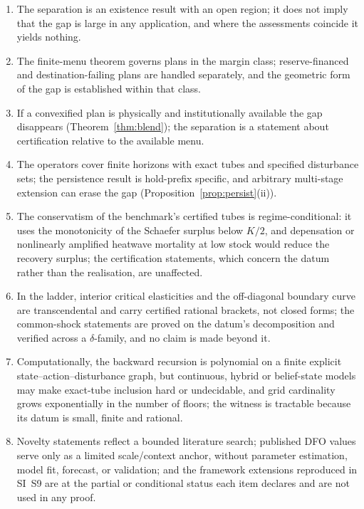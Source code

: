 \documentclass[preprint,11pt,authoryear]{elsarticle}
\theoremstyle{definition}
\theoremstyle{remark}
\begin{document}
\begin{enumerate}[label=(\roman*),leftmargin=2em]
\item The separation is an existence result with an open region; it does not imply that the gap is large in any application, and where the assessments coincide it yields nothing.
\item The finite-menu theorem governs plans in the margin class; reserve-financed and destination-failing plans are handled separately, and the geometric form of the gap is established within that class.
\item If a convexified plan is physically and institutionally available the gap disappears (Theorem~\ref{thm:blend}); the separation is a statement about certification relative to the available menu.
\item The operators cover finite horizons with exact tubes and specified disturbance sets; the persistence result is hold-prefix specific, and arbitrary multi-stage extension can erase the gap (Proposition~\ref{prop:persist}(ii)).
\item The conservatism of the benchmark's certified tubes is regime-conditional: it uses the monotonicity of the Schaefer surplus below $K/2$, and depensation or nonlinearly amplified heatwave mortality at low stock would reduce the recovery surplus; the certification statements, which concern the datum rather than the realisation, are unaffected.
\item In the ladder, interior critical elasticities and the off-diagonal boundary curve are transcendental and carry certified rational brackets, not closed forms; the common-shock statements are proved on the datum's decomposition and verified across a $\delta$-family, and no claim is made beyond it.
\item Computationally, the backward recursion is polynomial on a finite explicit state--action--disturbance graph, but continuous, hybrid or belief-state models may make exact-tube inclusion hard or undecidable, and grid cardinality grows exponentially in the number of floors; the witness is tractable because its datum is small, finite and rational.
\item Novelty statements reflect a bounded literature search; published DFO values serve only as a limited scale/context anchor, without parameter estimation, model fit, forecast, or validation; and the framework extensions reproduced in SI~S9 are at the partial or conditional status each item declares and are not used in any proof.
\end{enumerate}
\end{document}
